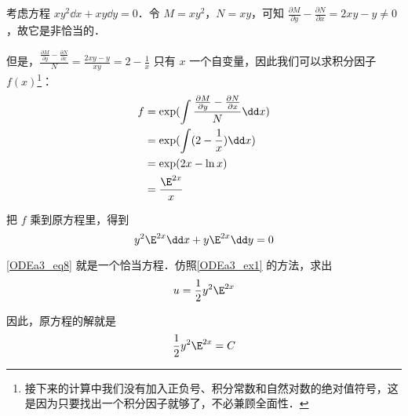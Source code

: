 \begin{example}{}
考虑方程 $xy^2\dd x+xy\dd y=0$．令 $M=xy^2$，$N=xy$，可知 $\frac{\partial M}{\partial y}-\frac{\partial N}{\partial x}=2xy-y\not=0$，故它是非恰当的．

但是，$\frac{\frac{\partial M}{\partial y}-\frac{\partial N}{\partial x}}{N}=\frac{2xy-y}{xy}=2-\frac{1}{x}$ 只有 $x$ 一个自变量，因此我们可以求积分因子 $f(x)$\footnote{接下来的计算中我们没有加入正负号、积分常数和自然对数的绝对值符号，这是因为只要找出一个积分因子就够了，不必兼顾全面性．}：
\begin{equation}
\begin{aligned}
f&=\exp(\int \frac{\frac{\partial M}{\partial y}-\frac{\partial N}{\partial x}}{N}\dd x)\\
&=\exp(\int(2-\frac{1}{x})\dd x)\\
&=\exp(2x-\ln x)\\
&=\frac{\E^{2x}}{x}
\end{aligned}
\end{equation}

把 $f$ 乘到原方程里，得到
\begin{equation}\label{ODEa3_eq8}
y^2\E^{2x}\dd x+y\E^{2x}\dd y=0
\end{equation}

\autoref{ODEa3_eq8} 就是一个恰当方程．仿照\autoref{ODEa3_ex1} 的方法，求出
\begin{equation}
u=\frac{1}{2}y^2\E^{2x}
\end{equation}

因此，原方程的解就是
\begin{equation}
\frac{1}{2}y^2\E^{2x}=C
\end{equation}



\end{example}






